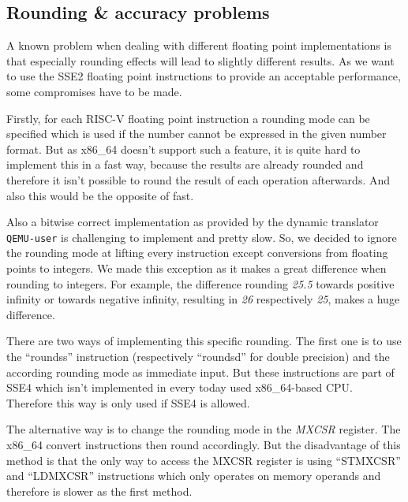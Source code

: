 \documentclass[course=eragp]{aspdoc}
\begin{document}
\subsection{Rounding \& accuracy problems}

A known problem when dealing with different floating point implementations is that especially
rounding effects will lead to slightly different results. As we want to use the SSE2 floating point
instructions to provide an acceptable performance, some compromises have to be made.

\par

Firstly, for each RISC-V floating point instruction a rounding mode can be specified which is used
if the number cannot be expressed in the given number format. But as x86\_64 doesn't support such a
feature, it is quite hard to implement this in a fast way, because the results are already rounded
and therefore it isn't possible to round the result of each operation afterwards. And also this
would be the opposite of fast.

\par

Also a bitwise correct implementation as provided by the dynamic translator \texttt{QEMU-user} is
challenging to implement and pretty slow. So, we decided to ignore the rounding mode at lifting
every instruction except conversions from floating points to integers. We made this exception as it
makes a great difference when rounding to integers. For example, the difference rounding \emph{25.5}
towards positive infinity or towards negative infinity, resulting in \emph{26} respectively
\emph{25}, makes a huge difference.

\par

There are two ways of implementing this specific rounding. The first one is to use the ``roundss''
instruction (respectively ``roundsd'' for double precision) and the according rounding mode as
immediate input. But these instructions are part of SSE4 which isn't implemented in every today used
x86\_64-based CPU.~\cite{intel2017man} Therefore this way is only used if SSE4 is allowed.

\par

The alternative way is to change the rounding mode in the \emph{MXCSR} register. The x86\_64 convert
instructions then round accordingly. But the disadvantage of this method is that the only way to
access the MXCSR register is using ``STMXCSR'' and ``LDMXCSR'' instructions which only operates on
memory operands and therefore is slower as the first method.~\cite{intel2017man}
\end{document}
